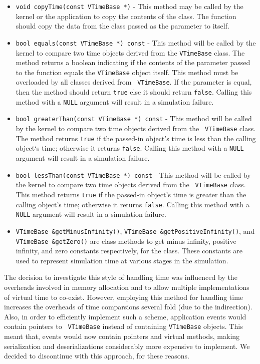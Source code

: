 \documentclass[11pt]{article}
\begin{document}
\begin{itemize}

\item{\tt void copyTime(const VTimeBase *)} - This method may be called by the
  kernel or the application to copy the contents of the class. The
  function should copy the data from the class passed as the parameter to
  itself.

\item{\tt bool equals(const VTimeBase *) const} - This method will be called by
  the kernel to compare two time objects derived from the {\tt VTimeBase}
  class. The method returns a boolean indicating if the contents of the
  parameter passed to the function equals the {\tt VTimeBase} object
  itself. This method must be overloaded by all classes derived from {\tt
  VTimeBase}. If the parameter is equal, then the method should return
  {\tt true} else it should return {\tt false}.  Calling this method with
  a {\tt NULL} argument will result in a simulation failure.

\item{\tt bool greaterThan(const VTimeBase *) const} - This method will be
  called by the kernel to compare two time objects derived from the {\tt
  VTimeBase} class.  The method returns {\tt true} if the passed-in
  object's time is less than the calling object`s time; otherwise it
  returns {\tt false}.  Calling this method with a {\tt NULL} argument
  will result in a simulation failure.

\item{\tt bool lessThan(const VTimeBase *) const} - This method will be
  called by the kernel to compare two time objects derived from the {\tt
  VTimeBase} class.  This method returns {\tt true} if the passed-in
  object's time is greater than the calling object's time; otherwise it
  returns {\tt false}.  Calling this method with a {\tt NULL} argument
  will result in a simulation failure.

\item {\tt VTimeBase \&getMinusInfinity()}, {\tt VTimeBase
  \&getPositiveInfinity()}, and {\tt VTimeBase \&getZero()} are class
  methods to get minus infinity, positive infinity, and zero constants
  respectively, for the class. These constants are used to represent
  simulation time at various stages in the simulation.

\end{itemize}

The decision to investigate this style of handling time was influenced by
the overheads involved in memory allocation and to allow multiple
implementations of virtual time to co-exist.  However, employing this
method for handling time increases the overheads of time comparsions
several fold (due to the indirection). Also, in order to efficiently
implement such a scheme, application events would contain pointers to {\tt
VTimeBase} instead of containing {\tt VTimeBase} objects. This meant that,
events would now contain pointers and virtual methods, making
serialization and deserializations considerably more expensive to
implement. We decided to discontinue with this approach, for these
reasons.
\end{document}
